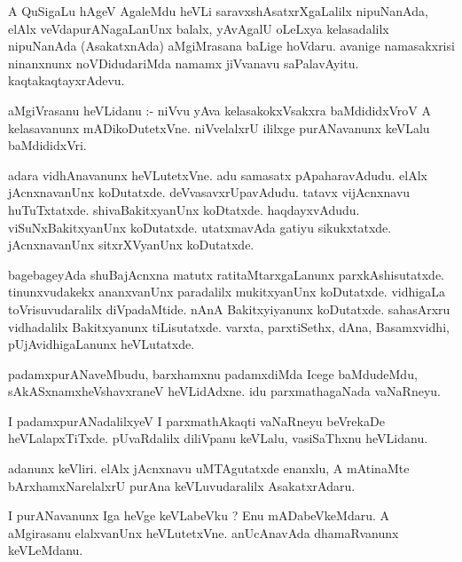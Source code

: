 \documentclass{article}
\begin{document}
\begin{mn}
A  QuSigaLu  hAgeV  AgaleMdu  heVLi  saravxshAsatxrXgaLalilx  nipuNanAda,  elAlx  veVdapurANagaLanUnx  
balalx,  yAvAgalU  oLeLxya  kelasadalilx  nipuNanAda  (AsakatxnAda)  aMgiMrasana  baLige  hoVdaru.  
avanige  namasakxrisi  ninanxnunx  noVDidudariMda  namamx  jiVvanavu  saPalavAyitu.  kaqtakaqtayxrAdevu.
\end{mn}

\begin{mn}
aMgiVrasanu  heVLidanu :- niVvu  yAva  kelasakokxVsakxra  baMdididxVroV  A  kelasavanunx  mADikoDutetxVne.  
niVvelalxrU  ililxge  purANavanunx  keVLalu  baMdididxVri.
\end{mn}

\begin{mn}
adara  vidhAnavanunx  heVLutetxVne.  adu  samasatx  pApaharavAdudu.  elAlx  jAcnxnavanUnx  koDutatxde.  
deVvasavxrUpavAdudu.  tatavx vijAcnxnavu  huTuTxtatxde.  shivaBakitxyanUnx  koDtatxde.  haqdayxvAdudu.  
viSuNxBakitxyanUnx  koDutatxde.  utatxmavAda  gatiyu  sikukxtatxde.  jAcnxnavanUnx  sitxrXVyanUnx  koDutatxde.
\end{mn}

\begin{mn}
bagebageyAda  shuBajAcnxna  matutx  ratitaMtarxgaLanunx  parxkAshisutatxde.  tinunxvudakekx  ananxvanUnx  paradalilx  
mukitxyanUnx  koDutatxde.  vidhigaLa  toVrisuvudaralilx  diVpadaMtide.  nAnA  Bakitxyiyanunx  koDutatxde.  sahasArxru  
vidhadalilx  Bakitxyanunx  tiLisutatxde.  varxta,  parxtiSethx,  dAna,  Basamxvidhi,  pUjAvidhigaLanunx  heVLutatxde.
\end{mn}

\begin{mn}
padamxpurANaveMbudu,  barxhamxnu  padamxdiMda  Icege  baMdudeMdu,  sAkASxnamxheVshavxraneV  heVLidAdxne.  
idu  parxmathagaNada  vaNaRneyu.
\end{mn}

\begin{mn}
I  padamxpurANadalilxyeV  I  parxmathAkaqti  vaNaRneyu  beVrekaDe  heVLalapxTiTxde.  pUvaRdalilx  diliVpanu  
keVLalu,  vasiSaThxnu  heVLidanu.
\end{mn}

\begin{mn}
adanunx  keVliri.  elAlx  jAcnxnavu  uMTAgutatxde  enanxlu,  A  mAtinaMte  bArxhamxNarelalxrU  purAna  
keVLuvudaralilx  AsakatxrAdaru.
\end{mn}

\begin{mn}
I  purANavanunx  Iga  heVge  keVLabeVku ?  Enu  mADabeVkeMdaru.  A  aMgirasanu  elalxvanUnx  heVLutetxVne.  
anUcAnavAda  dhamaRvanunx  keVLeMdanu.
\end{mn}
\end{document}
